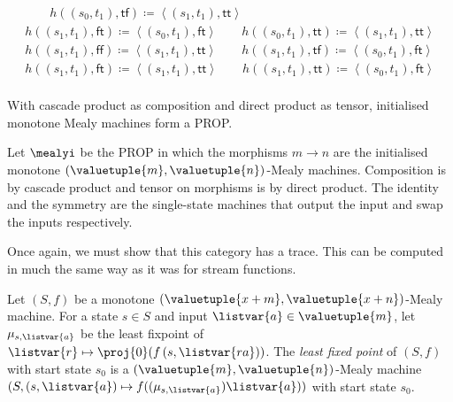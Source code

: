 \begin{example}
\begin{gather*}
        \qquad
        h((s_0, t_1), \mathsf{tf})
        \coloneqq
        \left\langle(s_1, t_1), \mathsf{tt}\right\rangle
        \\
        h((s_1, t_1), \mathsf{ft})
        \coloneqq
        \left\langle(s_0, t_1), \mathsf{ft}\right\rangle
        \qquad
        h((s_0, t_1), \mathsf{tt})
        \coloneqq
        \left\langle(s_1, t_1), \mathsf{tt}\right\rangle
        \\
        h((s_1, t_1), \mathsf{ff})
        \coloneqq
        \left\langle(s_1, t_1), \mathsf{tt}\right\rangle
        \qquad
        h((s_1, t_1), \mathsf{tf})
        \coloneqq
        \left\langle(s_0, t_1), \mathsf{ft}\right\rangle
        \\
        h((s_1, t_1), \mathsf{ft})
        \coloneqq
        \left\langle(s_1, t_1), \mathsf{tt}\right\rangle
        \qquad
        h((s_1, t_1), \mathsf{tt})
        \coloneqq
        \left\langle(s_0, t_1), \mathsf{ft}\right\rangle
        \\
        
    \end{gather*}
\end{example}

With cascade product as composition and direct product as tensor, initialised
monotone Mealy machines form a PROP.

\begin{definition}
    Let \(\mealyi\) be the PROP in which the morphisms
    \(m \to n\) are the initialised monotone
    \((\valuetuple{m}, \valuetuple{n})\)-Mealy machines.
    Composition is by cascade product and tensor on morphisms is by
    direct product.
    The identity and the symmetry are the single-state machines that output the
    input and swap the inputs respectively.
\end{definition}

Once again, we must show that this category has a trace.
This can be computed in much the same way as it was for stream functions.

\begin{definition}
    Let \((S, f)\) be a monotone \(
    (\valuetuple{x+m}, \valuetuple{x+n})
    \)-Mealy machine.
    For a state \(s \in S\) and input \(\listvar{a} \in \valuetuple{m}\), let
    \(\mu_{s,\listvar{a}}\) be the least fixpoint of \(
    \listvar{r} \mapsto \proj{0}\mleft(f\left(s, \listvar{ra}\right)\mright)
    \).
    The \emph{least fixed point} of \((S, f)\) with start state \(s_0\) is a \(
    (\valuetuple{m}, \valuetuple{n})
    \)-Mealy machine \(
    (S, (s, \listvar{a}) \mapsto f((\mu_{s,\listvar{a}})\listvar{a}))
    \) with start state \(s_0\).
\end{definition}

